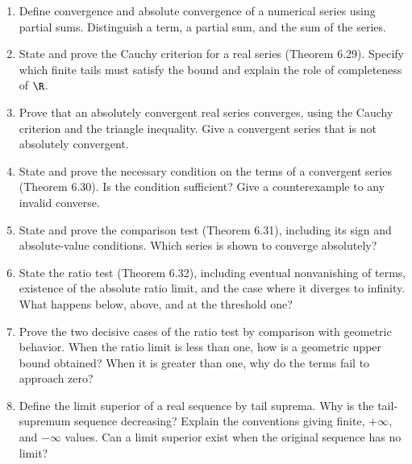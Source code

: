 \begin{enumerate}[resume]
  \item Define convergence and absolute convergence of a numerical
    series using partial sums. Distinguish a term, a partial sum,
    and the sum of the series.

  \item State and prove the Cauchy criterion for a real series
    (Theorem 6.29). Specify which finite tails must satisfy the bound
    and explain the role of completeness of \(\R\).

  \item Prove that an absolutely convergent real series converges,
    using the Cauchy criterion and the triangle inequality.
    Give a convergent series that is not absolutely convergent.

  \item State and prove the necessary condition on the terms of
    a convergent series (Theorem 6.30). Is the condition sufficient?
    Give a counterexample to any invalid converse.

  \item State and prove the comparison test (Theorem 6.31), including
    its sign and absolute-value conditions. Which series is shown
    to converge absolutely?

  \item State the ratio test (Theorem 6.32), including eventual
    nonvanishing of terms, existence of the absolute ratio limit,
    and the case where it diverges to infinity.
    What happens below, above, and at the threshold one?

  \item Prove the two decisive cases of the ratio test by comparison
    with geometric behavior. When the ratio limit is less than one,
    how is a geometric upper bound obtained? When it is greater
    than one, why do the terms fail to approach zero?

  \item Define the limit superior of a real sequence by tail
    suprema. Why is the tail-supremum sequence decreasing?
    Explain the conventions giving finite, \(+\infty\), and
    \(-\infty\) values. Can a limit superior exist when the
    original sequence has no limit?


\end{enumerate}
